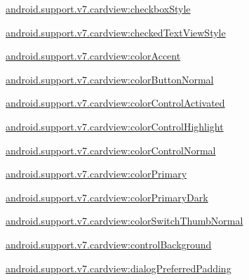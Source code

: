 {\ttfamily \hyperlink{classandroid_1_1support_1_1v7_1_1cardview_1_1R_1_1styleable_a1297109594ea429301e0fdfe894a1d4a}{android.\+support.\+v7.\+cardview\+:checkbox\+Style}}

{\ttfamily \hyperlink{classandroid_1_1support_1_1v7_1_1cardview_1_1R_1_1styleable_aaefec504d42232e1b60c6846dbcb882f}{android.\+support.\+v7.\+cardview\+:checked\+Text\+View\+Style}}

{\ttfamily \hyperlink{classandroid_1_1support_1_1v7_1_1cardview_1_1R_1_1styleable_a8b1986b83a7cb120ab848ae271cb90c8}{android.\+support.\+v7.\+cardview\+:color\+Accent}}

{\ttfamily \hyperlink{classandroid_1_1support_1_1v7_1_1cardview_1_1R_1_1styleable_ac1be9238d1481c26c4f89271a750fce2}{android.\+support.\+v7.\+cardview\+:color\+Button\+Normal}}

{\ttfamily \hyperlink{classandroid_1_1support_1_1v7_1_1cardview_1_1R_1_1styleable_acb93386ddcf1e452debdf2acf6cb2f17}{android.\+support.\+v7.\+cardview\+:color\+Control\+Activated}}

{\ttfamily \hyperlink{classandroid_1_1support_1_1v7_1_1cardview_1_1R_1_1styleable_a49a7aa79b96c0ee6b0ea6d734fb2c0c2}{android.\+support.\+v7.\+cardview\+:color\+Control\+Highlight}}

{\ttfamily \hyperlink{classandroid_1_1support_1_1v7_1_1cardview_1_1R_1_1styleable_a4c2e0c570b5982613b8cebb46cb6626a}{android.\+support.\+v7.\+cardview\+:color\+Control\+Normal}}

{\ttfamily \hyperlink{classandroid_1_1support_1_1v7_1_1cardview_1_1R_1_1styleable_a1ded3a190d020f33c8807adef684cbee}{android.\+support.\+v7.\+cardview\+:color\+Primary}}

{\ttfamily \hyperlink{classandroid_1_1support_1_1v7_1_1cardview_1_1R_1_1styleable_a43a0f2dbaa8e5b83115079105d180ee5}{android.\+support.\+v7.\+cardview\+:color\+Primary\+Dark}}

{\ttfamily \hyperlink{classandroid_1_1support_1_1v7_1_1cardview_1_1R_1_1styleable_a992cb4f1559d830c77adbb17b8d9d0b6}{android.\+support.\+v7.\+cardview\+:color\+Switch\+Thumb\+Normal}}

{\ttfamily \hyperlink{classandroid_1_1support_1_1v7_1_1cardview_1_1R_1_1styleable_aded076ba098cace6d5af80e46448b628}{android.\+support.\+v7.\+cardview\+:control\+Background}}

{\ttfamily \hyperlink{classandroid_1_1support_1_1v7_1_1cardview_1_1R_1_1styleable_ae8501eb855f89c1202f5514c8347c99f}{android.\+support.\+v7.\+cardview\+:dialog\+Preferred\+Padding}}

